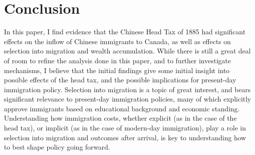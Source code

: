 \section{Conclusion}

In this paper, I find evidence that the Chinese Head Tax of 1885 had significant effects on the inflow of Chinese immigrants to Canada, as well as effects on selection into migration and wealth accumulation. While there is still a great deal of room to refine the analysis done in this paper, and to further investigate mechanisms, I believe that the initial findings give some initial insight into possible effects of the head tax, and the possible implications for present-day immigration policy. Selection into migration is a topic of great interest, and bears significant relevance to present-day immigration policies, many of which explicitly approve immigrants based on educational background and economic standing. Understanding how immigration costs, whether explicit (as in the case of the head tax), or implicit (as in the case of modern-day immigration), play a role in selection into migration and outcomes after arrival, is key to understanding how to best shape policy going forward. 

